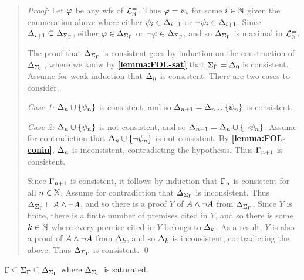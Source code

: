 \begin{quote} 
  \textit{Proof:} 
  Let $\varphi$ be any wfs of $\mathcal{L}^{=}_{\mathbb{N}}$.
  Thus $\varphi=\psi_i$ for some $i\in\mathbb{N}$ given the enumeration above where either $\psi_i\in\Delta_{i+1}$ or $\neg\psi_i\in\Delta_{i+1}$.
  Since $\Delta_{i+1}\subseteq\Delta_{\Sigma_{\Gamma}}$, either $\varphi\in\Delta_{\Sigma_{\Gamma}}$ or $\neg\varphi\in\Delta_{\Sigma_{\Gamma}}$, and so $\Delta_{\Sigma_{\Gamma}}$ is maximal in $\mathcal{L}^{=}_{\mathbb{N}}$.

  The proof that $\Delta_{\Sigma_{\Gamma}}$ is consistent goes by induction on the construction of $\Delta_{\Sigma_{\Gamma}}$, where we know by \textbf{\ref{lemma:FOL-sat}} that $\Sigma_{\Gamma}=\Delta_0$ is consistent. 
  Assume for weak induction that $\Delta_n$ is consistent. 
  There are two cases to consider.

  \textit{Case 1:} $\Delta_n\cup\lbrace\psi_n\rbrace$ is consistent, and so $\Delta_{n+1}=\Delta_n\cup\lbrace\psi_n\rbrace$ is consistent. 

  \textit{Case 2:} $\Delta_n\cup\lbrace\psi_n\rbrace$ is not consistent, and so $\Delta_{n+1}=\Delta_n\cup\lbrace\neg\psi_n\rbrace$. 
  Assume for contradiction that $\Delta_n\cup\lbrace\neg\psi_n\rbrace$ is not consistent. 
  By \textbf{\ref{lemma:FOL-conin}}, $\Delta_n$ is inconsistent, contradicting the hypothesis. 
  Thus $\Gamma_{n+1}$ is consistent. 

  Since $\Gamma_{n+1}$ is consistent, it follows by induction that $\Gamma_n$ is consistent for all $n\in\mathbb{N}$.
  Assume for contradiction that $\Delta_{\Sigma_{\Gamma}}$ is inconsistent.
  Thus $\Delta_{\Sigma_{\Gamma}}\vdash A\wedge\neg A$, and so there is a proof $Y$ of $A\wedge\neg A$ from $\Delta_{\Sigma_{\Gamma}}$. 
  Since $Y$ is finite, there is a finite number of premises cited in $Y$, and so there is some $k\in\mathbb{N}$ where every premise cited in $Y$ belongs to $\Delta_k$.
  As a result, $Y$ is also a proof of $A\wedge\neg A$ from $\Delta_k$, and so $\Delta_k$ is inconsistent, contradicting the above. 
  Thus $\Delta_{\Sigma_{\Gamma}}$ is consistent. 
  \qed
\end{quote}




\begin{Lthm} \label{lemma:FOL-include}
  $\Gamma\subseteq\Sigma_{\Gamma}\subseteq\Delta_{\Sigma_{\Gamma}}$ where $\Delta_{\Sigma_{\Gamma}}$ is saturated.
\end{Lthm}
 
